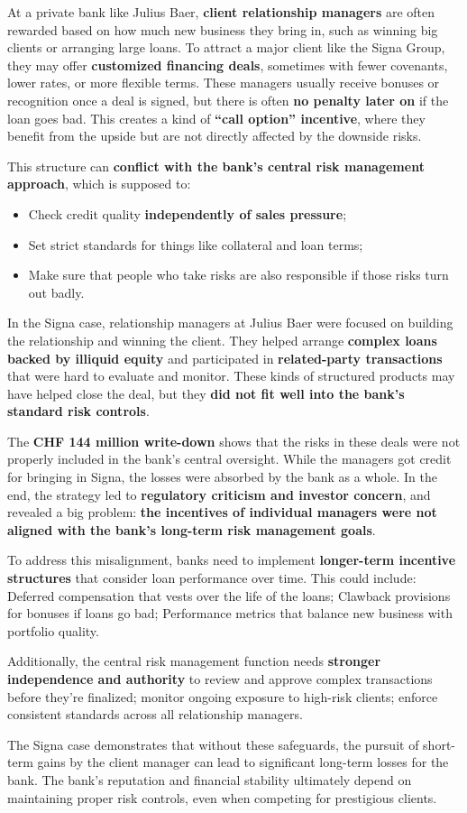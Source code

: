 At a private bank like Julius Baer, \textbf{client relationship managers} are often rewarded based on how much new business they bring in, such as winning big clients or arranging large loans. To attract a major client like the Signa Group, they may offer \textbf{customized financing deals}, sometimes with fewer covenants, lower rates, or more flexible terms. These managers usually receive bonuses or recognition once a deal is signed, but there is often \textbf{no penalty later on} if the loan goes bad. This creates a kind of \textbf{``call option'' incentive}, where they benefit from the upside but are not directly affected by the downside risks.

This structure can \textbf{conflict with the bank's central risk management approach}, which is supposed to:
\begin{itemize}
    \item Check credit quality \textbf{independently of sales pressure};
    \item Set strict standards for things like collateral and loan terms;
    \item Make sure that people who take risks are also responsible if those risks turn out badly.
\end{itemize}

In the Signa case, relationship managers at Julius Baer were focused on building the relationship and winning the client. They helped arrange \textbf{complex loans backed by illiquid equity} and participated in \textbf{related-party transactions} that were hard to evaluate and monitor. These kinds of structured products may have helped close the deal, but they \textbf{did not fit well into the bank's standard risk controls}.

The \textbf{CHF 144 million write-down} shows that the risks in these deals were not properly included in the bank's central oversight. While the managers got credit for bringing in Signa, the losses were absorbed by the bank as a whole. In the end, the strategy led to \textbf{regulatory criticism and investor concern}, and revealed a big problem: \textbf{the incentives of individual managers were not aligned with the bank's long-term risk management goals}.

To address this misalignment, banks need to implement \textbf{longer-term incentive structures} that consider loan performance over time. This could include:
 Deferred compensation that vests over the life of the loans;
Clawback provisions for bonuses if loans go bad;
Performance metrics that balance new business with portfolio quality.

Additionally, the central risk management function needs \textbf{stronger independence and authority} to review and approve complex transactions before they're finalized;
monitor ongoing exposure to high-risk clients;
enforce consistent standards across all relationship managers.

The Signa case demonstrates that without these safeguards, the pursuit of short-term gains by the client manager can lead to significant long-term losses for the bank. The bank's reputation and financial stability ultimately depend on maintaining proper risk controls, even when competing for prestigious clients.
